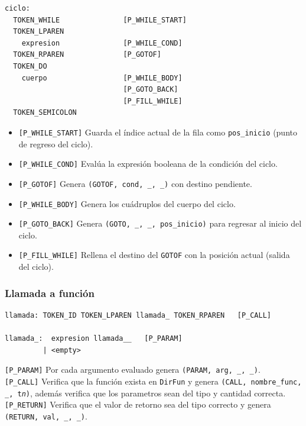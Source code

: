 \documentclass[12pt, letterpaper]{article}
\theoremstyle{definition}
\begin{document}
\begin{verbatim}
ciclo:
  TOKEN_WHILE               [P_WHILE_START]
  TOKEN_LPAREN
    expresion               [P_WHILE_COND]
  TOKEN_RPAREN              [P_GOTOF]
  TOKEN_DO
    cuerpo                  [P_WHILE_BODY]
                            [P_GOTO_BACK]
                            [P_FILL_WHILE]
  TOKEN_SEMICOLON
\end{verbatim}

\begin{itemize}
    \item \texttt{[P\_WHILE\_START]} Guarda el índice actual de la fila como \texttt{pos\_inicio} (punto de regreso del ciclo).
    \item \texttt{[P\_WHILE\_COND]} Evalúa la expresión booleana de la condición del ciclo.
    \item \texttt{[P\_GOTOF]} Genera \texttt{(GOTOF, cond, \_, \_)} con destino pendiente.
    \item \texttt{[P\_WHILE\_BODY]} Genera los cuádruplos del cuerpo del ciclo.
    \item \texttt{[P\_GOTO\_BACK]} Genera \texttt{(GOTO, \_, \_, pos\_inicio)} para regresar al inicio del ciclo.
    \item \texttt{[P\_FILL\_WHILE]} Rellena el destino del \texttt{GOTOF} con la posición actual (salida del ciclo).
\end{itemize}

\subsubsection*{Llamada a función}

\begin{verbatim}
llamada: TOKEN_ID TOKEN_LPAREN llamada_ TOKEN_RPAREN   [P_CALL]

llamada_:  expresion llamada__   [P_PARAM]
         | <empty>
\end{verbatim}

\texttt{[P\_PARAM]} Por cada argumento evaluado genera \texttt{(PARAM, arg, \_, \_)}.\\
\texttt{[P\_CALL]} Verifica que la función exista en \texttt{DirFun} y genera \texttt{(CALL, nombre\_func, \_, t\textit{n})}, además verifica que los parametros sean del tipo y cantidad correcta. \\
\texttt{[P\_RETURN]} Verifica que el valor de retorno sea del tipo correcto y genera \texttt{(RETURN, val, \_, \_)}. \\
\end{document}
